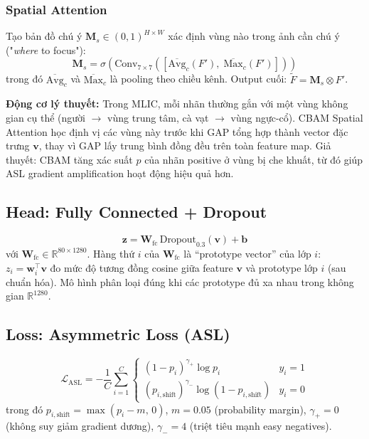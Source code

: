 \documentclass[conference]{IEEEtran}
\begin{document}
\subsubsection{Spatial Attention}
Tạo bản đồ chú ý $\mathbf{M}_s \in (0,1)^{H \times W}$ xác định vùng nào
trong ảnh cần chú ý ("\textit{where} to focus"):
\begin{equation}
  \mathbf{M}_s = \sigma\!\left(
    \text{Conv}_{7\times7}\!\left([
      \overline{\text{Avg}}_c(F'),\;
      \overline{\text{Max}}_c(F')
    ]\right)
  \right)
  \label{eq:spatial_attn}
\end{equation}
trong đó $\overline{\text{Avg}}_c$ và $\overline{\text{Max}}_c$ là pooling
theo chiều kênh.
Output cuối: $\tilde{F} = \mathbf{M}_s \otimes F'$.

\textbf{Động cơ lý thuyết:}
Trong MLIC, mỗi nhãn thường gắn với một vùng không gian cụ thể
(người $\to$ vùng trung tâm, cà vạt $\to$ vùng ngực-cổ).
CBAM Spatial Attention học định vị các vùng này trước khi GAP
tổng hợp thành vector đặc trưng $\mathbf{v}$,
thay vì GAP lấy trung bình đồng đều trên toàn feature map.
Giả thuyết: CBAM tăng xác suất $p$ của nhãn positive ở vùng bị che khuất,
từ đó giúp ASL gradient amplification hoạt động hiệu quả hơn.

\subsection{Head: Fully Connected + Dropout}

\begin{equation}
  \mathbf{z} = \mathbf{W}_{\text{fc}}\, \text{Dropout}_{0.3}(\mathbf{v}) + \mathbf{b}
  \label{eq:fc}
\end{equation}
với $\mathbf{W}_{\text{fc}} \in \mathbb{R}^{80 \times 1280}$.
Hàng thứ $i$ của $\mathbf{W}_{\text{fc}}$ là ``prototype vector'' của lớp $i$:
$z_i = \mathbf{w}_i^\top \mathbf{v}$ đo mức độ tương đồng cosine
giữa feature $\mathbf{v}$ và prototype lớp $i$ (sau chuẩn hóa).
Mô hình phân loại đúng khi các prototype đủ xa nhau trong không gian $\mathbb{R}^{1280}$.

\subsection{Loss: Asymmetric Loss (ASL)}

\begin{equation}
  \mathcal{L}_{\text{ASL}} = -\frac{1}{C}\sum_{i=1}^{C}
  \begin{cases}
    (1-p_i)^{\gamma_+}\log p_i & y_i = 1 \\[4pt]
    (p_{i,\text{shift}})^{\gamma_-}\log(1 - p_{i,\text{shift}}) & y_i = 0
  \end{cases}
  \label{eq:asl}
\end{equation}
trong đó $p_{i,\text{shift}} = \max(p_i - m,\, 0)$,
$m = 0.05$ (probability margin),
$\gamma_+ = 0$ (không suy giảm gradient dương),
$\gamma_- = 4$ (triệt tiêu mạnh easy negatives).
\end{document}
